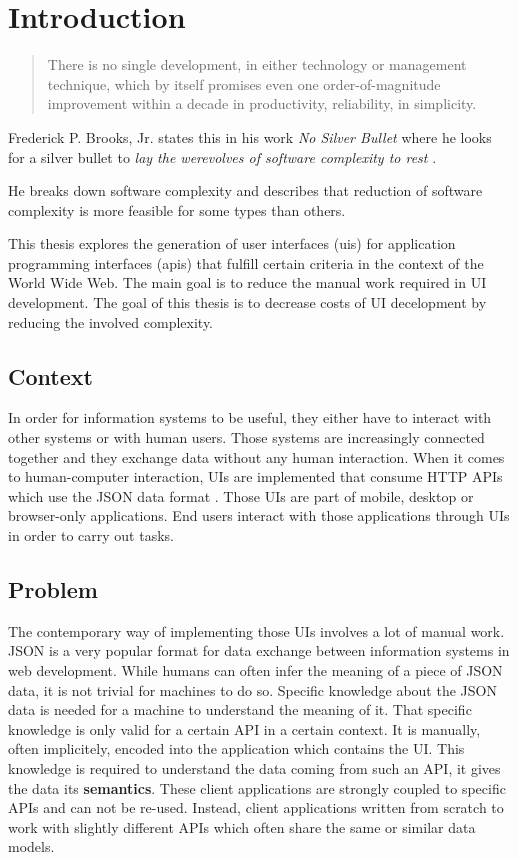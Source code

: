 \section{Introduction}\label{introduction}

\begin{quotation}
There is no single development, in either technology or management technique, which by itself promises even one order-of-magnitude improvement within a decade in productivity, reliability, in simplicity.
\end{quotation}

Frederick P. Brooks, Jr. states this in his work \textit{No Silver Bullet} where he looks for a silver bullet to \textit{lay the werevolves of software complexity to rest} \citep{nosilverbullet}.

He breaks down software complexity and describes that reduction of software complexity is more feasible for some types than others.

This thesis explores the generation of user interfaces (\gls{ui}s) for application programming interfaces (\gls{api}s) that fulfill certain criteria in the context of the World Wide Web. The main goal is to reduce the manual work required in UI development. The goal of this thesis is to decrease costs of UI decelopment by reducing the involved complexity.

\subsection{Context}\label{context}
In order for information systems to be useful, they either have to interact with other systems or with human users. Those systems are increasingly connected together and they exchange data without any human interaction. When it comes to human-computer interaction, UIs are implemented that consume HTTP APIs which use the JSON data format \citep{jsonformat}. Those UIs are part of mobile, desktop or browser-only applications. End users interact with those applications through UIs in order to carry out tasks.

\subsection{Problem}\label{problem}
The contemporary way of implementing those UIs involves a lot of manual work. JSON is a very popular format for data exchange between information systems in web development. While humans can often infer the meaning of a piece of JSON data, it is not trivial for machines to do so. Specific knowledge about the JSON data is needed for a machine to understand the meaning of it. That specific knowledge is only valid for a certain API in a certain context. It is manually, often implicitely, encoded into the application which contains the UI. This knowledge is required to understand the data coming from such an API, it gives the data its \textbf{semantics}. These client applications are strongly coupled to specific APIs and can not be re-used. Instead, client applications written from scratch to work with slightly different APIs which often share the same or similar data models.

